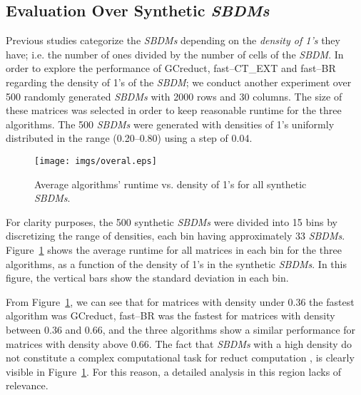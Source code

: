 \documentclass[letterpaper, twoside, openright, 12pt]{book}%
\begin{document}
\subsection{Evaluation Over Synthetic \textit{SBDMs}}\label{sub:synth}
%
	Previous studies \citep{Rojas12,Lias13,Rodriguez15} categorize the \textit{SBDMs} depending on the \emph{density of 1's} they have; i.e. the number of ones divided by the number of cells of the \textit{SBDM}. In order to explore the performance of GCreduct, fast--CT\_EXT and fast--BR regarding the density of 1's of the \textit{SBDM}; we conduct another experiment over 500 randomly generated \textit{SBDMs} with 2000 rows and 30 columns. The size of these matrices was selected in order to keep reasonable runtime for the three algorithms. The 500 \textit{SBDMs} were generated with densities of 1's uniformly distributed in the range (0.20--0.80) using a step of 0.04. 
				
	\begin{figure}[H]
		\begin{center}
			\texttt{[image: imgs/overal.eps]}
		\end{center}
		\caption{Average algorithms' runtime vs. density of 1's for all synthetic \textit{SBDMs}.}
		\label{fig:scattDensity}
	\end{figure}	

	For clarity purposes, the 500 synthetic \textit{SBDMs} were divided into 15 bins by discretizing the range of densities, each bin having approximately 33 \textit{SBDMs}. Figure~\ref{fig:scattDensity} shows the average runtime for all  matrices in each bin for the three algorithms, as a function of the density of 1's in the synthetic \textit{SBDMs}. In this figure, the vertical bars show the standard deviation in each bin. 
		
	From Figure~\ref{fig:scattDensity}, we can see that for matrices with density under 0.36  the fastest algorithm was GCreduct, fast--BR was the fastest for matrices with density between 0.36 and 0.66, and the three algorithms show a similar performance for matrices with density above 0.66. The fact that \textit{SBDMs} with a high density do not constitute a complex computational task for reduct computation \citep{Rojas12}, is clearly visible in Figure~\ref{fig:scattDensity}. For this reason, a detailed analysis in this region lacks of relevance.
		
\end{document}
